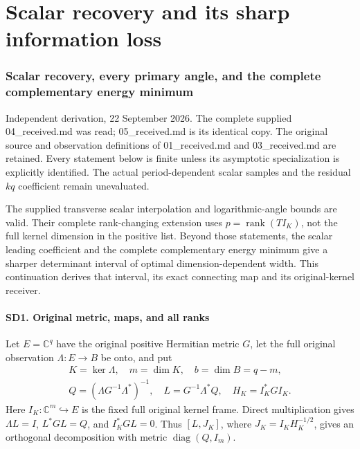 \documentclass[11pt]{article}
\begin{document}
\clearpage\part{Scalar recovery and its sharp information loss}
\section{Scalar recovery, every primary angle, and the complete complementary energy minimum}\label{scalar-recovery-every-primary-angle-and-the-complete-complementary-energy-minimum}

Independent derivation, 22 September 2026. The complete supplied 04\_received.md was read; 05\_received.md is its identical copy. The original source and observation definitions of 01\_received.md and 03\_received.md are retained. Every statement below is finite unless its asymptotic specialization is explicitly identified. The actual period-dependent scalar samples and the residual \(kq\) coefficient remain unevaluated.

The supplied transverse scalar interpolation and logarithmic-angle bounds are valid. Their complete rank-changing extension uses \(p=\operatorname{rank}(TI_K)\), not the full kernel dimension in the positive list. Beyond those statements, the scalar leading coefficient and the complete complementary energy minimum give a sharper determinant interval of optimal dimension-dependent width. This continuation derives that interval, its exact connecting map and its original-kernel receiver.

\subsection{SD1. Original metric, maps, and all ranks}\label{sd1.-original-metric-maps-and-all-ranks}

Let \(E=\mathbb C^q\) have the original positive Hermitian metric \(G\), let the full original observation \(\Lambda:E\to B\) be onto, and put \[
\begin{gathered}
K=\ker\Lambda,\quad m=\dim K,\quad b=\dim B=q-m,\\
Q=(\Lambda G^{-1}\Lambda^*)^{-1},\quad
L=G^{-1}\Lambda^*Q,\quad H_K=I_K^*GI_K.
\end{gathered}
\tag{SD1}
\] Here \(I_K:\mathbb C^m\hookrightarrow E\) is the fixed full original kernel frame. Direct multiplication gives \(\Lambda L=I\), \(L^*GL=Q\), and \(I_K^*GL=0\). Thus \([L,J_K]\), where \(J_K=I_KH_K^{-1/2}\), gives an orthogonal decomposition with metric \(\operatorname{diag}(Q,I_m)\).
\end{document}
